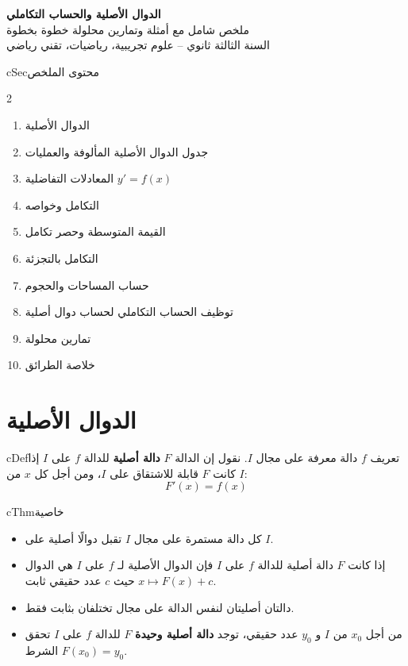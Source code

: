 \documentclass[12pt,a4paper]{article}
\newenvironment{BOX}[2]{\begin{otherlanguage}{english}\begin{arbox}{#1}{#2}}{\end{arbox}\end{otherlanguage}}
\newenvironment{tarif}[1][تعريف]{\begin{BOX}{cDef}{#1}}{\end{BOX}}
\newenvironment{khassia}[1][خاصية]{\begin{BOX}{cThm}{#1}}{\end{BOX}}
\newenvironment{LTR}{\begin{otherlanguage}{english}}{\end{otherlanguage}}
\begin{document}
\begin{LTR}
\begin{tcolorbox}[enhanced,colback=cSec,colframe=cSec,arc=3mm,halign=center,boxrule=0pt,top=12pt,bottom=12pt,before upper={\selectlanguage{arabic}}]
{\color{white}\fontsize{28}{34}\selectfont\bfseries الدوال الأصلية والحساب التكاملي}\\[8pt]
{\color{white}\large ملخص شامل مع أمثلة وتمارين محلولة خطوة بخطوة}\\[5pt]
{\color{white}\large السنة الثالثة ثانوي -- علوم تجريبية، رياضيات، تقني رياضي}
\end{tcolorbox}
\end{LTR}

\begin{BOX}{cSec}{محتوى الملخص}
\begin{multicols}{2}
\begin{enumerate}[label=\arabic*.]
\item الدوال الأصلية
\item جدول الدوال الأصلية المألوفة والعمليات
\item المعادلات التفاضلية $y'=f(x)$
\item التكامل وخواصه
\item القيمة المتوسطة وحصر تكامل
\item التكامل بالتجزئة
\item حساب المساحات والحجوم
\item توظيف الحساب التكاملي لحساب دوال أصلية
\item تمارين محلولة
\item خلاصة الطرائق
\end{enumerate}
\end{multicols}
\end{BOX}

\section{الدوال الأصلية}
\begin{tarif}
$f$ دالة معرفة على مجال $I$. نقول إن الدالة $F$ \textbf{دالة أصلية} للدالة $f$ على $I$ إذا كانت $F$ قابلة للاشتقاق على $I$، ومن أجل كل $x$ من $I$:
\[ F'(x)=f(x) \]
\end{tarif}

\begin{khassia}
\begin{itemize}
\item كل دالة مستمرة على مجال $I$ تقبل دوالًا أصلية على $I$.
\item إذا كانت $F$ دالة أصلية للدالة $f$ على $I$ فإن الدوال الأصلية لـ $f$ على $I$ هي الدوال $x\mapsto F(x)+c$ حيث $c$ عدد حقيقي ثابت.
\item دالتان أصليتان لنفس الدالة على مجال تختلفان بثابت فقط.
\item من أجل $x_0$ من $I$ و $y_0$ عدد حقيقي، توجد \textbf{دالة أصلية وحيدة} $F$ للدالة $f$ على $I$ تحقق الشرط $F(x_0)=y_0$.
\end{itemize}
\end{khassia}
\end{document}
